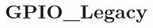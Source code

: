 \hypertarget{group___g_p_i_o___legacy}{\section{G\-P\-I\-O\-\_\-\-Legacy}
\label{group___g_p_i_o___legacy}
}
